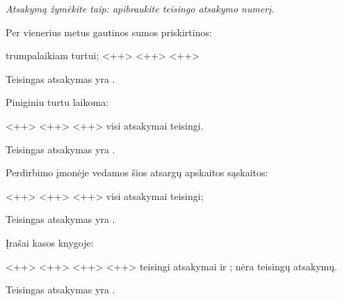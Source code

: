 \begin{tasks}

  \emph{Atsakymą žymėkite taip: apibraukite teisingo atsakymo numerį.}

  \begin{task}
    \begin{condition}
      Per vienerius metus gautinos sumos priskirtinos:
      \begin{enumerate}
         trumpalaikiam turtui;
         <++>
         <++>
         <++>
      \end{enumerate}
    \end{condition}
    \begin{solution}
      Teisingas atsakymas yra .
    \end{solution}
  \end{task}

  \begin{task}
    \begin{condition}
      Piniginiu turtu laikoma:
      \begin{enumerate}
         <++>
         <++>
         <++>
         visi atsakymai teisingi.
      \end{enumerate}
    \end{condition}
    \begin{solution}
      Teisingas atsakymas yra .
    \end{solution}
  \end{task}

  \begin{task}
    \begin{condition}
      Perdirbimo įmonėje vedamos šios atsargų apskaitos sąskaitos:
      \begin{enumerate}
         <++>
         <++>
         <++>
         visi atsakymai teisingi;
      \end{enumerate}
    \end{condition}
    \begin{solution}
      Teisingas atsakymas yra .
    \end{solution}
  \end{task}

  \begin{task}
    \begin{condition}
      Įrašai kasos knygoje:
      \begin{enumerate}
         <++>
         <++>
         <++>
         <++>
         teisingi atsakymai  ir ;
         nėra teisingų atsakymų.
      \end{enumerate}
    \end{condition}
    \begin{solution}
      Teisingas atsakymas yra .
    \end{solution}
  \end{task}


\end{tasks}
